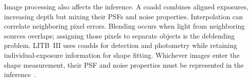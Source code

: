 Image processing also affects the inference. A coadd combines aligned exposures, increasing depth but mixing their PSFs and noise properties. Interpolation can correlate neighboring pixel errors. Blending occurs when light from neighboring sources overlaps; assigning those pixels to separate objects is the deblending problem. LITB~III uses coadds for detection and photometry while retaining individual-exposure information for shape fitting. Whichever images enter the shape measurement, their PSF and noise properties must be represented in the inference~\cite{saha_lensing_2026-1,rowe_galsim_2015}.
